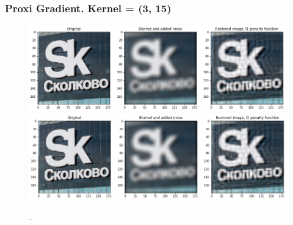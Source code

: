 \documentclass[hyperref={pdfpagelabels=false}]{beamer}
\begin{document}
\begin{frame}
\frametitle{Proxi Gradient. Kernel = (3, 15)}
\begin{center}
\begin{figure}[h]
\begin{adjustwidth}{-0.2cm}{-0.5 cm}
\includegraphics[scale=0.355]{l1_all_imgs_3_15.png} \\
\includegraphics[scale=0.355]{l2_all_imgs_3_15.png} \\
\end{adjustwidth}
\caption{.}
\end{figure}
\end{center}

\end{frame}
\end{document}
